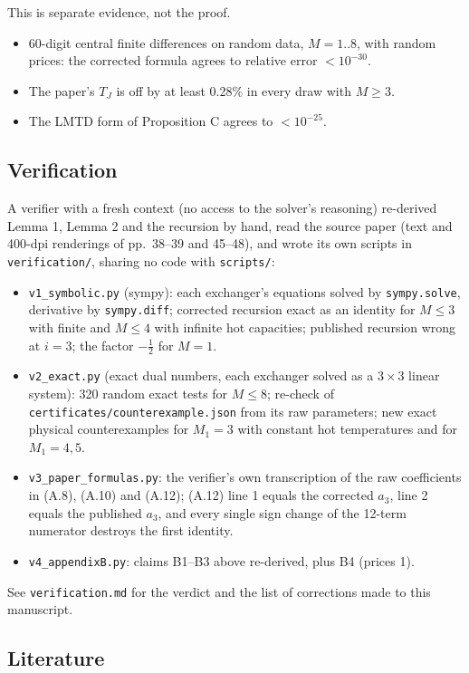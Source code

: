 \documentclass[11pt,a4paper]{report}
\begin{document}
This is separate evidence, not the proof.
\begin{itemize}
\item 60-digit central finite differences on random data, \(M = 1..8\), with random prices: the corrected formula agrees
to relative error \(< 10^{-30}\).
\item The paper's \(T_J\) is off by at least 0.28\% in every draw with \(M \ge 3\).
\item The LMTD form of Proposition C agrees to \(< 10^{-25}\).
\end{itemize}

\subsection{Verification}

A verifier with a fresh context (no access to the solver's reasoning) re-derived Lemma 1, Lemma 2 and the recursion by
hand, read the source paper (text and 400-dpi renderings of pp.~38--39 and 45--48), and wrote its own scripts in
\texttt{verification/}, sharing no code with \texttt{scripts/}:
\begin{itemize}
\item \texttt{v1\_symbolic.py} (sympy): each exchanger's equations solved by \texttt{sympy.solve}, derivative by
\texttt{sympy.diff}; corrected recursion exact as an identity for \(M \le 3\) with finite and \(M \le 4\) with infinite
hot capacities; published recursion wrong at \(i = 3\); the factor \(-\tfrac12\) for \(M = 1\).
\item \texttt{v2\_exact.py} (exact dual numbers, each exchanger solved as a \(3\times3\) linear system): 320 random
exact tests for \(M \le 8\); re-check of \texttt{certificates/counterexample.json} from its raw parameters; new exact
physical counterexamples for \(M_1 = 3\) with constant hot temperatures and for \(M_1 = 4, 5\).
\item \texttt{v3\_paper\_formulas.py}: the verifier's own transcription of the raw coefficients in (A.8), (A.10) and
(A.12); (A.12) line 1 equals the corrected \(a_3\), line 2 equals the published \(a_3\), and every single sign change
of the 12-term numerator destroys the first identity.
\item \texttt{v4\_appendixB.py}: claims B1--B3 above re-derived, plus B4 (prices 1).
\end{itemize}
See \texttt{verification.md} for the verdict and the list of corrections made to this manuscript.

\subsection{Literature}
\end{document}
